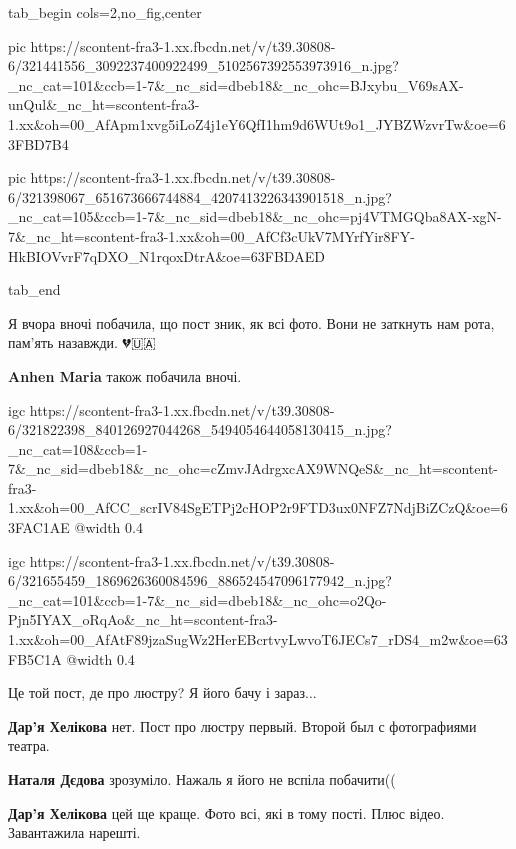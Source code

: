 \begin{center}
\begin{minipage}{\textwidth}


\ifcmt
  tab_begin cols=2,no_fig,center

     pic https://scontent-fra3-1.xx.fbcdn.net/v/t39.30808-6/321441556_3092237400922499_5102567392553973916_n.jpg?_nc_cat=101&ccb=1-7&_nc_sid=dbeb18&_nc_ohc=BJxybu_V69sAX-unQul&_nc_ht=scontent-fra3-1.xx&oh=00_AfApm1xvg5iLoZ4j1eY6QfI1hm9d6WUt9o1_JYBZWzvrTw&oe=63FBD7B4

     pic https://scontent-fra3-1.xx.fbcdn.net/v/t39.30808-6/321398067_651673666744884_4207413226343901518_n.jpg?_nc_cat=105&ccb=1-7&_nc_sid=dbeb18&_nc_ohc=pj4VTMGQba8AX-xgN-7&_nc_ht=scontent-fra3-1.xx&oh=00_AfCf3cUkV7MYrfYir8FY-HkBIOVvrF7qDXO_N1rqoxDtrA&oe=63FBDAED

  tab_end
\fi

\end{minipage}
\end{center}


Я вчора вночі побачила, що пост зник, як всі фото. Вони не заткнуть нам рота,
пам'ять назавжди. 💔🇺🇦

\begin{itemize} %
\textbf{Anhen Maria} також побачила вночі.
\end{itemize} %


\ifcmt
  igc https://scontent-fra3-1.xx.fbcdn.net/v/t39.30808-6/321822398_840126927044268_5494054644058130415_n.jpg?_nc_cat=108&ccb=1-7&_nc_sid=dbeb18&_nc_ohc=cZmvJAdrgxcAX9WNQeS&_nc_ht=scontent-fra3-1.xx&oh=00_AfCC_scrIV84SgETPj2cHOP2r9FTD3ux0NFZ7NdjBiZCzQ&oe=63FAC1AE
  @width 0.4
\fi


\ifcmt
  igc https://scontent-fra3-1.xx.fbcdn.net/v/t39.30808-6/321655459_1869626360084596_886524547096177942_n.jpg?_nc_cat=101&ccb=1-7&_nc_sid=dbeb18&_nc_ohc=o2Qo-Pjn5IYAX_oRqAo&_nc_ht=scontent-fra3-1.xx&oh=00_AfAtF89jzaSugWz2HerEBcrtvyLwvoT6JECs7_rDS4_m2w&oe=63FB5C1A
  @width 0.4
\fi


Це той пост, де про люстру? Я його бачу і зараз...

\begin{itemize} %
\textbf{Дар'я Хелікова} нет. Пост про люстру первый. Второй был с фотографиями театра.

\textbf{Наталя Дєдова} зрозуміло. Нажаль я його не вспіла побачити((

\textbf{Дар'я Хелікова} цей ще краще. Фото всі, які в тому пості. Плюс відео. Завантажила нарешті.
\end{itemize} %

